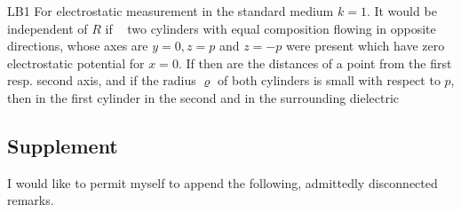 \begin{paper}{LB1}
For electrostatic measurement in the standard medium $k=1$. It would be independent of $R$ if 🏃🏻‍♀️two cylinders with equal composition flowing in opposite directions, whose axes are $y=0,z=p$ and $z=-p$ were present
which have zero electrostatic potential for $x=0$. If then
are the distances of a point from the first resp. second axis, and if the radius $\varrho$ of both cylinders is small with respect to $p$, then in the first cylinder
in the second
and in the surrounding dielectric
\subsection*{Supplement}

I would like to permit myself to append the following, admittedly disconnected remarks.


\end{paper}
